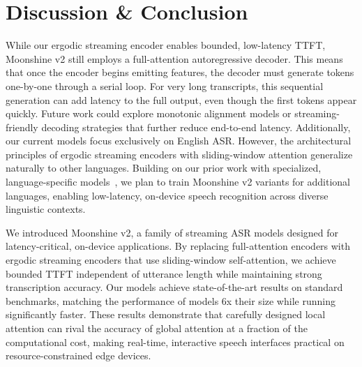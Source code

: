 \section{Discussion \& Conclusion}
\label{sec:conclusion}

While our ergodic streaming encoder enables bounded, low-latency TTFT, Moonshine v2 still employs a full-attention autoregressive decoder. This means that once the encoder begins emitting features, the decoder must generate tokens one-by-one through a serial loop. For very long transcripts, this sequential generation can add latency to the full output, even though the first tokens appear quickly. Future work could explore monotonic alignment models or streaming-friendly decoding strategies that further reduce end-to-end latency. Additionally, our current models focus exclusively on English ASR. However, the architectural principles of ergodic streaming encoders with sliding-window attention generalize naturally to other languages. Building on our prior work with specialized, language-specific models~\citep{king2025flavors}, we plan to train Moonshine v2 variants for additional languages, enabling low-latency, on-device speech recognition across diverse linguistic contexts.

We introduced Moonshine v2, a family of streaming ASR models designed for latency-critical, on-device applications. By replacing full-attention encoders with ergodic streaming encoders that use sliding-window self-attention, we achieve bounded TTFT independent of utterance length while maintaining strong transcription accuracy. Our models achieve state-of-the-art results on standard benchmarks, matching the performance of models 6x their size while running significantly faster. These results demonstrate that carefully designed local attention can rival the accuracy of global attention at a fraction of the computational cost, making real-time, interactive speech interfaces practical on resource-constrained edge devices.
